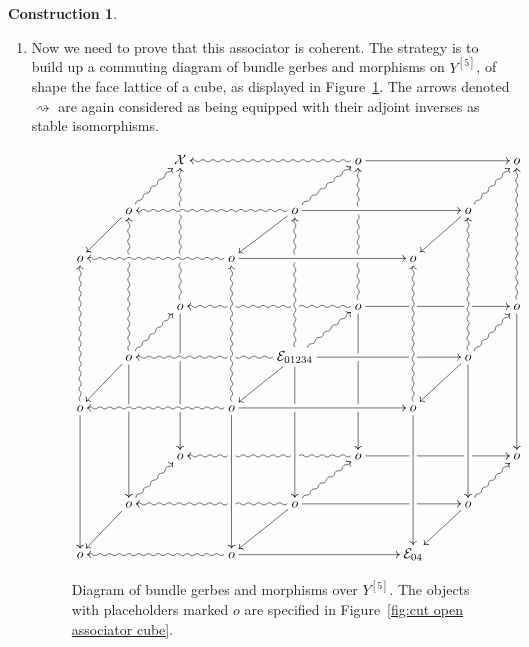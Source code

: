 \documentclass[12pt]{amsart}
\theoremstyle{plain}
\theoremstyle{definition}
\newtheorem{construction}[theorem]{Construction}
\theoremstyle{remark}
\numberwithin{equation}{section}
\newcommand{\cE}{{\mathcal E}}
\newcommand{\<}{\langle}
\renewcommand{\>}{\rangle}
\begin{document}
\begin{construction}
\begin{enumerate}
\item Now we need to prove that this associator is coherent. The strategy is to build up a commuting diagram of bundle gerbes and morphisms on $Y^{[5]}$, of shape the face lattice of a cube, as displayed in Figure~\ref{fig:big_cube}. 
The arrows denoted $\rightsquigarrow$ are again considered as being equipped with their adjoint inverses as stable isomorphisms. 
\begin{figure}
\[
	\xymatrix{   %
		&& \mathcal{X} &&& \ar@{~>}[lll]_{} o\ar[rrr] &&& o\\
		& o \ar@{~>}[ur]^{} \ar[dl] &&& \ar@{~>}[lll]_{} o\ar@{~>}[ur]^{} \ar[dl] \ar[rrr] &&& 			o \ar@{~>}[ur]^{} \ar[dl]\\
		o &&& \ar@{~>}[lll]^{} o \ar[rrr] &&& o
		\\
		&& o \ar@{~>}[uuu]^{}|!{[ur];[ull]}{\hole}|!{[uurr];[uul]}{\hole} \ar[ddd]|!{[drr];[dl]}{\hole}|!{[ddr];[ddll]}{\hole}&&& 
			\ar@{~>}[lll]^{}|!{[ull];[ul]}{\hole}|!{[ddll];[ull]}{\hole} o \ar@{~>}^{}|!{[ull];[ul]}{\hole}|!{[uurr];[uul]}{\hole}[uuu]   \ar[rrr]|!{[ddr];[ur]}{\hole}|!{[drr];[uurr]}{\hole} \ar[ddd]|!{[dl];[drr]}{\hole}|!{[ddll];[ddr]}{\hole}	&&& 
			o \ar@{~>}[uuu]^{} \ar[ddd]\\
		& o \ar@{~>}[uuu]^{}|!{[uurr];[uul]}{\hole} \ar@{~>}[ur]^{} \ar[dl] \ar[ddd]|!{[drr];[dl]}{\hole}&&& 
			\ar@{~>}[lll]^{}|!{[dl];[uul]}{\hole} \cE_{01234}				\ar@{~>}[ur]^{} \ar@{~>}[uuu]^{}|!{[uul];[uurr]}{\hole} \ar[dl] \ar[rrr]|!{[drr];[uurr]}{\hole} \ar[ddd]|!{[dl];[drr]}{\hole} &&& 
			o \ar@{~>}[ur]^{}\ar@{~>}[uuu]^{} \ar[dl] \ar[ddd]\\
		o \ar@{~>}[uuu]^{} \ar[ddd] &&& \ar@{~>}[lll]^{}o \ar@{~>}[uuu]^{}\ar[ddd] \ar[rrr] &&			& o \ar@{~>}[uuu]^{} \ar[ddd]
		\\
		&& o &&& \ar@{~>}[lll]^{}|!{[uul];[dl]}{\hole}|!{[ull];[ddll]}{\hole} o\ar[rrr]|!{[ur];[ddr]}{\hole}|!{[uurr];[drr]}{\hole} &&& o\\
		& o \ar@{~>}[ur]^{} \ar[dl] &&& \ar@{~>}[lll]^{}|!{[uul];[dl]}{\hole} o\ar@{~>}[ur]^{} \ar[dl] \ar[rrr]|!{[uurr];[drr]}{\hole} &&& o \ar@{~>}[ur]_{} \ar[dl]\\
		o &&& \ar@{~>}[lll]_{} o \ar[rrr] &&& \cE_{04}\\
	}
\]
\caption{Diagram of bundle gerbes and morphisms over $Y^{[5]}$. The objects with placeholders marked $o$ are specified in Figure~\ref{fig:cut open associator cube}.}
\label{fig:big_cube}
\end{figure}


\end{enumerate}
\end{construction}
\end{document}
